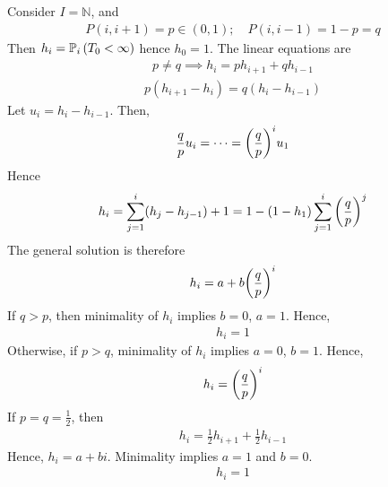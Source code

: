 \begin{example}
	Consider $I = \mathbb N$, and
	\begin{align*}
		P(i, i+1) = p \in (0,1);\quad P(i, i-1) = 1-p = q
	\end{align*}
	Then $h_i = \mathbb{P}_{i}\left({T_0 < \infty}\right)$ hence $h_0 = 1$.
	The linear equations are
	\begin{align*}
		p \neq q \implies h_i = p h_{i+1} + q h_{i-1}
	\end{align*}
	\begin{align*}
		p(h_{i+1} - h_i) = q(h_i - h_{i-1})
	\end{align*}
	Let $u_i = h_i - h_{i-1}$.
	Then,
	\begin{align*}
		\frac{q}{p} u_i = \dots = \qty(\frac{q}{p})^i u_1
	\end{align*}
	Hence
	\begin{align*}
		h_i = \sum_{j=1}^i (h_j - h_{j-1}) + 1 = 1 - (1-h_1) \sum_{j=1}^i \qty(\frac{q}{p})^j
	\end{align*}
	The general solution is therefore
	\begin{align*}
		h_i = a + b \qty(\frac{q}{p})^i
	\end{align*}
	If $q > p$, then minimality of $h_i$ implies $b = 0$, $a = 1$.
	Hence,
	\begin{align*}
		h_i = 1
	\end{align*}
	Otherwise, if $p > q$, minimality of $h_i$ implies $a = 0$, $b = 1$.
	Hence,
	\begin{align*}
		h_i = \qty(\frac{q}{p})^i
	\end{align*}
	If $p = q = \frac{1}{2}$, then
	\begin{align*}
		h_i = \frac{1}{2} h_{i+1} + \frac{1}{2} h_{i-1}
	\end{align*}
	Hence, $h_i = a + bi$.
	Minimality implies $a = 1$ and $b = 0$.
	\begin{align*}
		h_i = 1
	\end{align*}
\end{example}

